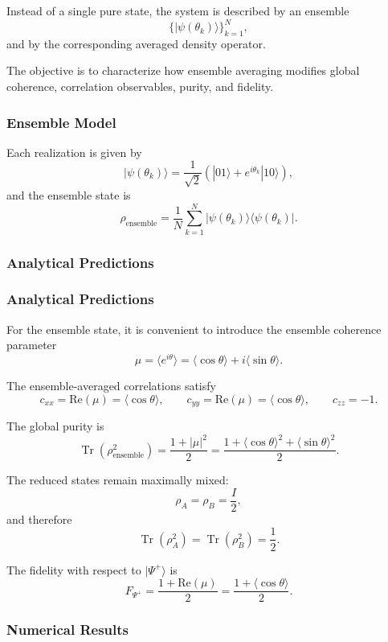 \documentclass[a4paper]{article}
\begin{document}
Instead of a single pure state, the system is described by an ensemble
\[
\{ |\psi(\theta_k)\rangle \}_{k=1}^{N},
\]
and by the corresponding averaged density operator.

The objective is to characterize how ensemble averaging modifies global coherence, correlation observables, purity, and fidelity.

\subsubsection{Ensemble Model}

Each realization is given by
\[
|\psi(\theta_k)\rangle
=
\frac{1}{\sqrt{2}}
\left(
|01\rangle + e^{i\theta_k}|10\rangle
\right),
\]
and the ensemble state is
\[
\rho_{\mathrm{ensemble}}
=
\frac{1}{N}
\sum_{k=1}^{N}
|\psi(\theta_k)\rangle\langle \psi(\theta_k)|.
\]

\subsubsection{Analytical Predictions}

\subsubsection{Analytical Predictions}

For the ensemble state, it is convenient to introduce the ensemble coherence parameter
\[
\mu = \langle e^{i\theta} \rangle
=
\langle \cos\theta \rangle + i \langle \sin\theta \rangle.
\]

The ensemble-averaged correlations satisfy
\[
c_{xx} = \mathrm{Re}(\mu) = \langle \cos\theta \rangle,\qquad
c_{yy} = \mathrm{Re}(\mu) = \langle \cos\theta \rangle,\qquad
c_{zz} = -1.
\]

The global purity is
\[
\operatorname{Tr}(\rho_{\mathrm{ensemble}}^2)
=
\frac{1 + |\mu|^2}{2}
=
\frac{1 + \langle \cos\theta \rangle^2 + \langle \sin\theta \rangle^2}{2}.
\]

The reduced states remain maximally mixed:
\[
\rho_A = \rho_B = \frac{I}{2},
\]
and therefore
\[
\operatorname{Tr}(\rho_A^2)=\operatorname{Tr}(\rho_B^2)=\frac{1}{2}.
\]

The fidelity with respect to \( |\Psi^+\rangle \) is
\[
F_{\Psi^+}
=
\frac{1 + \mathrm{Re}(\mu)}{2}
=
\frac{1 + \langle \cos\theta \rangle}{2}.
\]

\subsubsection{Numerical Results}
\end{document}
